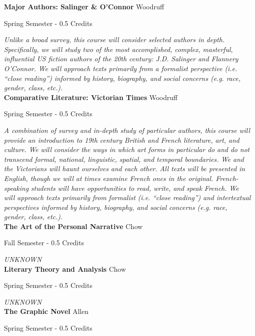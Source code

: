 \noindent\textbf{Major Authors: Salinger \& O'Connor} \hfill Woodruff

\noindent Spring Semester - 0.5 Credits

\vspace{1mm}\emph{Unlike a broad survey, this course will consider selected authors in depth. Specifically, we will study two of the most accomplished, complex, masterful, influential US fiction authors of the 20th century: J.D. Salinger and Flannery O’Connor. We will approach texts primarily from a formalist perspective (i.e. ``close reading'') informed by history, biography, and social concerns (e.g. race, gender, class, etc.).}\\


\noindent\textbf{Comparative Literature: Victorian Times} \hfill Woodruff

\noindent Spring Semester - 0.5 Credits

\vspace{1mm}\emph{A combination of survey and in-depth study of particular authors, this course will provide an introduction to 19th century British and French literature, art, and culture. We will consider the ways in which art forms in particular do and do not transcend formal, national, linguistic, spatial, and temporal boundaries. We and the Victorians will haunt ourselves and each other. All texts will be presented in English, though we will at times examine French ones in the original. French-speaking students will have opportunities to read, write, and speak French. We will approach texts primarily from formalist (i.e. “close reading”) and intertextual perspectives informed by history, biography, and social concerns (e.g. race, gender, class, etc.).}\\


\noindent\textbf{The Art of the Personal Narrative} \hfill Chow

\noindent Fall Semester - 0.5 Credits

\vspace{1mm}\emph{UNKNOWN}\\


\noindent\textbf{Literary Theory and Analysis} \hfill Chow

\noindent Spring Semester - 0.5 Credits

\vspace{1mm}\emph{UNKNOWN}\\


\noindent\textbf{The Graphic Novel} \hfill Allen

\noindent Spring Semester - 0.5 Credits

